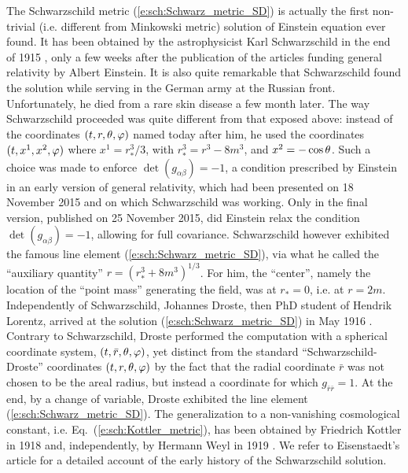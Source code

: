 \begin{hist}
The Schwarzschild metric (\ref{e:sch:Schwarz_metric_SD}) is actually
the first non-trivial (i.e. different from Minkowski metric) solution
of Einstein equation ever found. It has been obtained by the
astrophysicist Karl Schwarzschild in the end of 1915 \cite{Schwa1916}, only a few weeks
after the publication of the articles funding general relativity by
Albert Einstein. It is also quite remarkable that
Schwarzschild found the solution while serving in the German army at the Russian
front. Unfortunately, he died from a rare skin disease a few month later.
The way Schwarzschild proceeded was quite different from that exposed above:
instead of the coordinates $(t,r,\theta,\varphi)$
named today after him, he used the coordinates
$(t,x^1,x^2,\varphi)$ where $x^1 = r_*^3/3$, with $r_*^3 = r^3-8m^3$, and
$x^2 = -\cos\theta$. Such a choice was made to enforce $\det(g_{\alpha\beta}) = -1$, a condition
prescribed by Einstein in an early version of general relativity, which had been presented on
18 November 2015 and on which Schwarzschild was working. Only in the final version, published on
25 November 2015, did Einstein relax the condition $\det(g_{\alpha\beta}) = -1$, allowing for full
covariance. Schwarzschild however
exhibited the famous line element (\ref{e:sch:Schwarz_metric_SD}), via what he
called the ``auxiliary quantity'' $r = (r_*^3 + 8m^3)^{1/3}$.
For him, the ``center'',  namely the location of the ``point mass'' generating the field,
was at $r_* = 0$, i.e. at $r=2m$.
Independently of Schwarzschild, Johannes Droste, then PhD student of
Hendrik Lorentz,
arrived at the solution (\ref{e:sch:Schwarz_metric_SD}) in May 1916 \cite{Drost1917}.
Contrary to Schwarzschild, Droste performed the computation with
a spherical coordinate system, $(t,\bar r, \theta,\varphi)$, yet distinct from
the standard ``Schwarzschild-Droste'' coordinates $(t,r,\theta,\varphi)$ by the fact that the radial
coordinate $\bar r$ was not chosen to be the areal radius, but instead a
coordinate for which $g_{\bar r\bar r} = 1$. At the end, by a change of
variable, Droste exhibited the line element (\ref{e:sch:Schwarz_metric_SD}).
The generalization to a non-vanishing cosmological constant, i.e.
Eq.~(\ref{e:sch:Kottler_metric}), has been obtained by
Friedrich Kottler in 1918 \cite{Kottl1918} and, independently, by
Hermann Weyl in 1919 \cite{Weyl1919}. We refer to Eisenstaedt's article
\cite{Eisen82} for a detailed account of the early history of the
Schwarzschild solution.
\end{hist}


